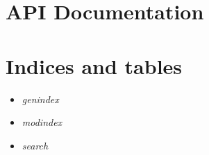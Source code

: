 \documentclass[letterpaper,10pt,english]{sphinxmanual}
\begin{document}
\chapter{API Documentation}
\label{api:api-documentation}\label{api::doc}\label{api:ethnologue-web-site}

\chapter{Indices and tables}
\label{index:indices-and-tables}\begin{itemize}
\item {} 
\emph{genindex}

\item {} 
\emph{modindex}

\item {} 
\emph{search}

\end{itemize}



\renewcommand{\indexname}{Index}
\printindex
\end{document}
